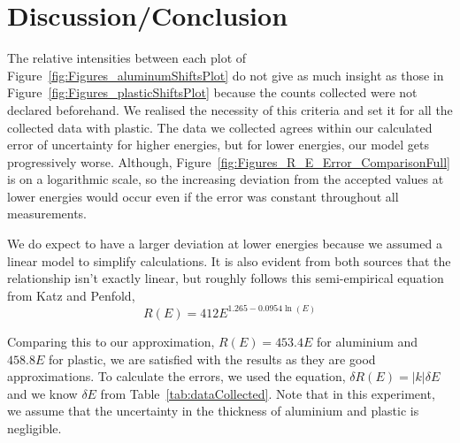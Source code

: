 
\section{Discussion/Conclusion}

\label{sec:discussion_conclusion} The relative intensities between each plot of Figure~\ref{fig:Figures_aluminumShiftsPlot} do not give as much insight as those in Figure~\ref{fig:Figures_plasticShiftsPlot} because the counts collected were not declared beforehand. We realised the necessity of this criteria and set it for all the collected data with plastic. The data we collected agrees within our calculated error of uncertainty for higher energies, but for lower energies, our model gets progressively worse. Although, Figure~\ref{fig:Figures_R_E_Error_ComparisonFull} is on a logarithmic scale, so the increasing deviation from the accepted values at lower energies would occur even if the error was constant throughout all measurements. 

We do expect to have a larger deviation at lower energies because we assumed a linear model to simplify calculations. It is also evident from both sources that the relationship isn't exactly linear, but roughly follows this semi-empirical equation from Katz and Penfold,\cite{RevModPhys.24.28} 
\begin{equation}
	R(E) = 412 E^{1.265 - 0.0954 \ln(E)} \label{eq:acceptedEq} 
\end{equation}

Comparing this to our approximation, $R(E) = 453.4 E$ for aluminium and $458.8 E$ for plastic, we are satisfied with the results as they are good approximations.   To calculate the errors, we used the equation,\cite{093570275X} $\delta R(E) = |k| \delta E$ and we know $\delta E$ from Table~\ref{tab:dataCollected}. Note that in this experiment, we assume that the uncertainty in the thickness of aluminium and plastic is negligible. 

